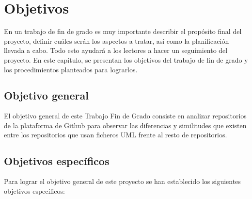 \documentclass[a4paper, 12pt]{book}
\begin{document}

\cleardoublepage %
\chapter{Objetivos} %
\label{chap:objetivos} %

En un trabajo de fin de grado es muy importante describir el propósito final del proyecto, definir cuáles serán los aspectos a tratar, así como la planificación llevada a cabo.
Todo esto ayudará a los lectores a hacer un seguimiento del proyecto. 
En este capítulo, se presentan los objetivos del trabajo de fin de grado y los procedimientos planteados para lograrlos.


\section{Objetivo general} %
\label{sec:objetivo-general} %

El objetivo general de este Trabajo Fin de Grado consiste en analizar repositorios de la plataforma de Github para observar las diferencias y similitudes que existen entre los repositorios que usan ficheros UML frente al resto de repositorios.

\section{Objetivos específicos}
\label{sec:objetivos-especificos}

Para lograr el objetivo general de este proyecto se han establecido los siguientes objetivos específicos:
\end{document}
